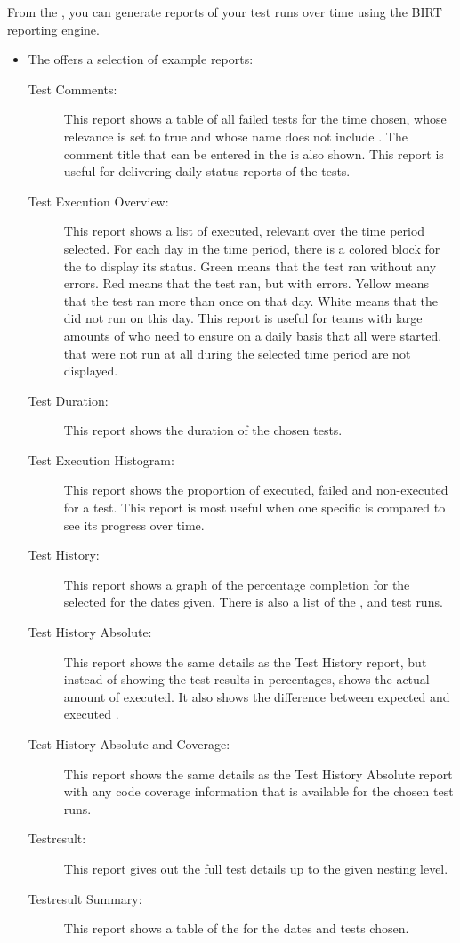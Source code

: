 From the \gdtestsummaryview{} , you can generate reports of your test runs over time using the BIRT reporting engine. 


\begin{itemize}
\item The \ite{} offers a selection of example reports:
\begin{description}
\item [Test Comments:]{This report shows a table of all failed tests for the time chosen, whose relevance is set to true and whose name does not include . The comment title that can be entered in the \gdtestsummaryview{}  is also shown. This report is useful for delivering daily status reports of the tests.}
\item [Test Execution Overview:]{This report shows a list of executed, relevant \gdsuites{} over the time period selected. For each day in the time period, there is a colored block for the \gdsuite{} to display its status. Green means that the test ran without any errors. Red means that the test ran, but with errors. Yellow means that the test ran more than once on that day. White means that the \gdsuite{} did not run on this day. This report is useful for teams with large amounts of \gdsuites{} who need to ensure on a daily basis that all \gdsuites{} were started. \gdsuites{} that were not run at all during the selected time period are not displayed.}
\item [Test Duration:]{This report shows the duration of the chosen tests.}
\item [Test Execution Histogram:]{This report shows the proportion of executed, failed and non-executed \gdsteps{} for a test. This report is most useful when one specific \gdsuite{} is compared to see its progress over time. }
\item [Test History:]{This report shows a graph of the percentage completion for the selected \gdsuites{} for the dates given. There is also a list of the \gdauts{}, \gdsuites{} and test runs.}
\item [Test History Absolute:]{This report shows the same details as the Test History report, but instead of showing the test results in percentages, shows the actual amount of \gdsteps{} executed. It also shows the difference between expected and executed \gdsteps{}.}
\item [Test History Absolute and Coverage:]{This report shows the same details as the Test History Absolute report with any code coverage information that is available for the chosen test runs.}
\item [Testresult:]{This report gives out the full test details up to the given nesting level.}
\item [Testresult Summary:]{This report shows a table of the \gdtestsummaryview{} for the dates and tests chosen. }
\end{description}


\end{itemize}
